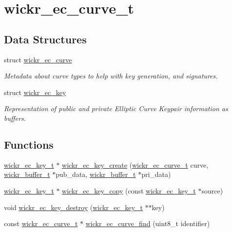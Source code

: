 \hypertarget{group__wickr__ec__curve}{}\section{wickr\+\_\+ec\+\_\+curve\+\_\+t}
\label{group__wickr__ec__curve}
\subsection*{Data Structures}
\begin{DoxyCompactItemize}
\item 
struct \hyperlink{structwickr__ec__curve}{wickr\+\_\+ec\+\_\+curve}
\begin{DoxyCompactList}\small\item\em Metadata about curve types to help with key generation, and signatures. \end{DoxyCompactList}\item 
struct \hyperlink{structwickr__ec__key}{wickr\+\_\+ec\+\_\+key}
\begin{DoxyCompactList}\small\item\em Representation of public and private Elliptic Curve Keypair information as buffers. \end{DoxyCompactList}\end{DoxyCompactItemize}
\subsection*{Functions}
\begin{DoxyCompactItemize}
\item 
\hyperlink{structwickr__ec__key}{wickr\+\_\+ec\+\_\+key\+\_\+t} $\ast$ \hyperlink{group__wickr__ec__curve_ga912f46bc12a39f57d8d1b87a639f7cdf}{wickr\+\_\+ec\+\_\+key\+\_\+create} (\hyperlink{structwickr__ec__curve}{wickr\+\_\+ec\+\_\+curve\+\_\+t} curve, \hyperlink{structwickr__buffer}{wickr\+\_\+buffer\+\_\+t} $\ast$pub\+\_\+data, \hyperlink{structwickr__buffer}{wickr\+\_\+buffer\+\_\+t} $\ast$pri\+\_\+data)
\item 
\hyperlink{structwickr__ec__key}{wickr\+\_\+ec\+\_\+key\+\_\+t} $\ast$ \hyperlink{group__wickr__ec__curve_gaf12eff11d78b2ce9ff32710406d58d4f}{wickr\+\_\+ec\+\_\+key\+\_\+copy} (const \hyperlink{structwickr__ec__key}{wickr\+\_\+ec\+\_\+key\+\_\+t} $\ast$source)
\item 
void \hyperlink{group__wickr__ec__curve_gac18ac86b270f540bf5a55ad271ab0568}{wickr\+\_\+ec\+\_\+key\+\_\+destroy} (\hyperlink{structwickr__ec__key}{wickr\+\_\+ec\+\_\+key\+\_\+t} $\ast$$\ast$key)
\item 
const \hyperlink{structwickr__ec__curve}{wickr\+\_\+ec\+\_\+curve\+\_\+t} $\ast$ \hyperlink{group__wickr__ec__curve_ga35d0968431b69993b7a6e3351d503d72}{wickr\+\_\+ec\+\_\+curve\+\_\+find} (uint8\+\_\+t identifier)
\end{DoxyCompactItemize}


